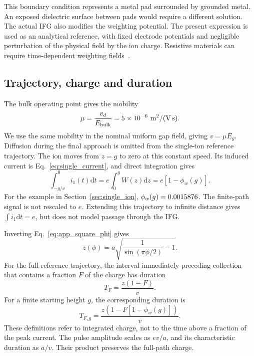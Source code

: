 \documentclass[11pt,a4paper]{article}
\newcommand{\dd}{\mathrm{d}}
\begin{document}
This boundary condition represents a metal pad surrounded by grounded metal. An exposed dielectric surface between pads would require a different solution. The actual IFG also modifies the weighting potential. The present expression is used as an analytical reference, with fixed electrode potentials and negligible perturbation of the physical field by the ion charge. Resistive materials can require time-dependent weighting fields~\cite{riegler2016,riegler2019}.

\subsection{Trajectory, charge and duration}
\label{app:single_duration}

The bulk operating point gives the mobility
\begin{equation}
 \mu=\frac{v_d}{E_{\rm bulk}}
 =5\times10^{-6}\ \mathrm{m^2/(V\,s)}.
\end{equation}
We use the same mobility in the nominal uniform gap field, giving $v=\mu E_g$. Diffusion during the final approach is omitted from the single-ion reference trajectory. The ion moves from $z=g$ to zero at this constant speed. Its induced current is Eq.~\eqref{eq:single_current}, and direct integration gives
\begin{equation}
 \int_{-g/v}^{0}i_1(t)\dd t
 =e\int_0^g W(z)\dd z
 =e[1-\phi_w(g)].
\end{equation}
For the example in Section~\ref{sec:single_ion}, $\phi_w(g)=0.0015876$. The finite-path signal is not rescaled to $e$. Extending this trajectory to infinite distance gives $\int i_1\dd t=e$, but does not model passage through the IFG.

Inverting Eq.~\eqref{eq:app_square_phi} gives
\begin{equation}
 z(\phi)=a\sqrt{\frac{1}{\sin(\pi\phi/2)}-1}.
 \label{eq:app_inverse_phi}
\end{equation}
For the full reference trajectory, the interval immediately preceding collection that contains a fraction $F$ of the charge has duration
\begin{equation}
 T_F=\frac{z(1-F)}{v}.
\end{equation}
For a finite starting height $g$, the corresponding duration is
\begin{equation}
 T_{F,g}=\frac{z\!\left(1-F[1-\phi_w(g)]\right)}{v}.
\end{equation}
These definitions refer to integrated charge, not to the time above a fraction of the peak current. The pulse amplitude scales as $ev/a$, and its characteristic duration as $a/v$. Their product preserves the full-path charge.
\end{document}
